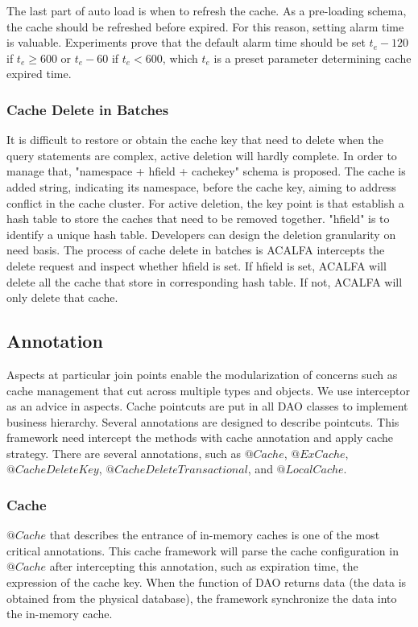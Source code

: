 \documentclass{singlecol-new}
\theoremstyle{TH}{
\newtheorem{lemma}{Lemma}
\newtheorem{theorem}[lemma]{Theorem}
\newtheorem{corrolary}[lemma]{Corrolary}
\newtheorem{conjecture}[lemma]{Conjecture}
\newtheorem{proposition}[lemma]{Proposition}
\newtheorem{claim}[lemma]{Claim}
\newtheorem{stheorem}[lemma]{Wrong Theorem}
}
\theoremstyle{THrm}{
\newtheorem{definition}{Definition}[section]
\newtheorem{question}{Question}[section]
\newtheorem{remark}{Remark}
\newtheorem{scheme}{Scheme}
}
\theoremstyle{THhit}{
\newtheorem{case}{Case}[section]
}
\begin{document}
The last part of auto load is when to refresh the cache. As a pre-loading schema, the cache should be refreshed before expired. For this reason, setting alarm time is valuable. Experiments prove that the default alarm time should be set $t_e - 120$ if $t_e \geq 600$ or $t_e - 60$ if $t_e < 600$, which $t_e$ is a preset parameter determining cache expired time.


\subsubsection{Cache Delete in Batches}
It is difficult to restore or obtain the cache key that need to delete when the query statements are complex, active deletion will hardly complete. In order to manage that, "namespace + hfield + cachekey" schema is proposed. The cache is added string, indicating its namespace, before the cache key, aiming to address conflict in the cache cluster. For active deletion, the key point is that establish a hash table to store the caches that need to be removed together. "hfield" is to identify a unique hash table. Developers can design the deletion granularity on need basis. The process of cache delete in batches is ACALFA intercepts the delete request and inspect whether hfield is set. If hfield is set, ACALFA will delete all the cache that store in corresponding hash table. If not, ACALFA will only delete that cache.

\subsection{Annotation}
Aspects at particular join points enable the modularization of concerns such as cache management that cut across multiple types and objects. We use interceptor as an advice in aspects. Cache pointcuts are put in all DAO classes to implement business hierarchy. Several annotations are designed to describe pointcuts. This framework need intercept the methods with cache annotation and apply cache strategy. There are several annotations, such as $@Cache$, $@ExCache$, $@CacheDeleteKey$, $@CacheDeleteTransactional$, and $@LocalCache$.

\subsubsection{Cache}
$@Cache$ that describes the entrance of in-memory caches is one of the most critical annotations. This cache framework will parse the cache configuration in $@Cache$ after intercepting this annotation, such as expiration time, the expression of the cache key. When the function of DAO returns data (the data is obtained from the physical database), the framework synchronize the data into the in-memory cache.
\end{document}

